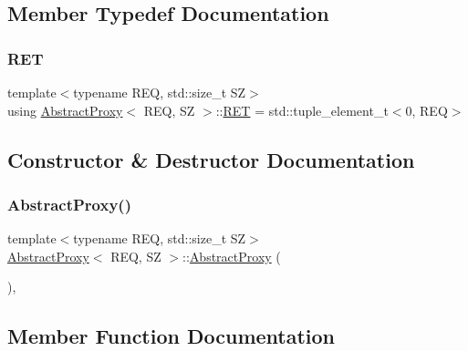 \subsection{Member Typedef Documentation}
\mbox{\label{classAbstractProxy_ab2af611a27c14916a27d0e9249f0291b}} 
\subsubsection{\texorpdfstring{R\+ET}{RET}}
{\footnotesize\ttfamily template$<$typename R\+EQ, std\+::size\+\_\+t SZ$>$ \\
using \hyperlink{classAbstractProxy}{Abstract\+Proxy}$<$ R\+EQ, SZ $>$\+::\hyperlink{classAbstractProxy_ab2af611a27c14916a27d0e9249f0291b}{R\+ET} =  std\+::tuple\+\_\+element\+\_\+t$<$0, R\+EQ$>$\hspace{0.3cm}{\ttfamily [protected]}}



\subsection{Constructor \& Destructor Documentation}
\mbox{\label{classAbstractProxy_a7ab9f653b68797bbd32b6ed90116ca9d}} 
\subsubsection{\texorpdfstring{Abstract\+Proxy()}{AbstractProxy()}}
{\footnotesize\ttfamily template$<$typename R\+EQ, std\+::size\+\_\+t SZ$>$ \\
\hyperlink{classAbstractProxy}{Abstract\+Proxy}$<$ R\+EQ, SZ $>$\+::\hyperlink{classAbstractProxy}{Abstract\+Proxy} (\begin{DoxyParamCaption}{ }\end{DoxyParamCaption})\hspace{0.3cm}{\ttfamily [inline]}, {\ttfamily [protected]}}



\subsection{Member Function Documentation}
\mbox{\label{classAbstractProxy_ab772bf6acfc0b7f69eae6fcc4039df8d}} 
